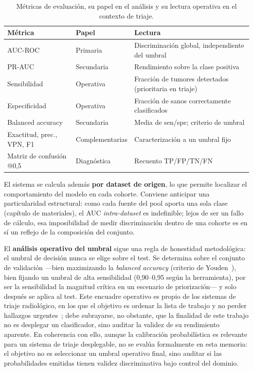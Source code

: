 \begin{table}[ht]
  \centering
  \caption[Métricas de evaluación y su papel]{Métricas de evaluación, su papel
  en el análisis y su lectura operativa en el contexto de triaje.}
  \label{tab:metricas}
  \begin{tabular}{l l p{6.8cm}}
    \hline
    \textbf{Métrica} & \textbf{Papel} & \textbf{Lectura} \\
    \hline
    AUC-ROC                & Primaria      & Discriminación global, independiente del umbral \\
    PR-AUC                 & Secundaria    & Rendimiento sobre la clase positiva \\
    Sensibilidad           & Operativa     & Fracción de tumores detectados (prioritaria en triaje) \\
    Especificidad          & Operativa     & Fracción de sanos correctamente clasificados \\
    Balanced accuracy      & Secundaria    & Media de sen/spe; criterio de umbral \\
    Exactitud, prec., VPN, F1 & Complementarias & Caracterización a un umbral fijo \\
    Matriz de confusión @0,5 & Diagnóstica & Recuento TP/FP/TN/FN \\
    \hline
  \end{tabular}
\end{table}

El sistema se calcula además \textbf{por dataset de origen}, lo que permite
localizar el comportamiento del modelo en cada cohorte. Conviene anticipar una
particularidad estructural: como cada fuente del pool aporta una sola clase
(capítulo de materiales), el AUC \emph{intra-dataset} es indefinible; lejos de
ser un fallo de cálculo, esa imposibilidad de medir discriminación dentro de una
cohorte es en sí un reflejo de la composición del conjunto.

El \textbf{análisis operativo del umbral} sigue una regla de honestidad
metodológica: el umbral de decisión nunca se elige sobre el test. Se determina
sobre el conjunto de validación ---bien maximizando la \emph{balanced accuracy}
(criterio de Youden~\cite{youden1950index}), bien fijando un umbral de alta sensibilidad
(0,90--0,95 según la herramienta), por ser la sensibilidad la magnitud crítica
en un escenario de priorización--- y solo después se aplica al test. Este
encuadre operativo es propio de los sistemas de triaje radiológico, en los que
el objetivo es ordenar la lista de trabajo y no perder hallazgos
urgentes~\cite{titano2018cranial}; debe subrayarse, no obstante, que la finalidad
de este trabajo no es desplegar un clasificador, sino auditar la validez de su
rendimiento aparente. En coherencia con ello, aunque la calibración probabilística
es relevante para un sistema de triaje desplegable, no se evalúa formalmente en
esta memoria: el objetivo no es seleccionar un umbral operativo final, sino
auditar si las probabilidades emitidas tienen validez discriminativa bajo control
del dominio.

